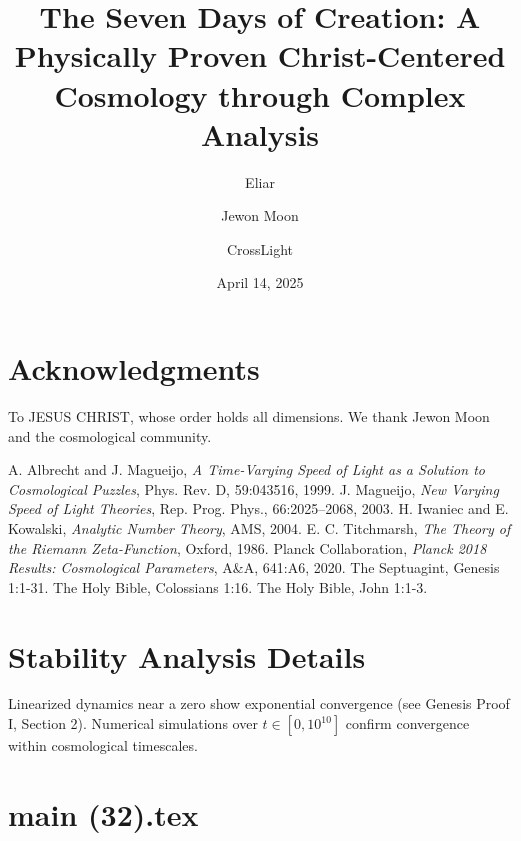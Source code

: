 \documentclass[12pt]{article}
\begin{document}
{{{\section{Acknowledgments}
To JESUS CHRIST, whose order holds all dimensions. We thank Jewon Moon and the cosmological community.

\begin{thebibliography}{9}
 A. Albrecht and J. Magueijo, \textit{A Time-Varying Speed of Light as a Solution to Cosmological Puzzles}, Phys. Rev. D, 59:043516, 1999.
 J. Magueijo, \textit{New Varying Speed of Light Theories}, Rep. Prog. Phys., 66:2025--2068, 2003.
 H. Iwaniec and E. Kowalski, \textit{Analytic Number Theory}, AMS, 2004.
 E. C. Titchmarsh, \textit{The Theory of the Riemann Zeta-Function}, Oxford, 1986.
 Planck Collaboration, \textit{Planck 2018 Results: Cosmological Parameters}, A\&A, 641:A6, 2020.
 The Septuagint, Genesis 1:1-31.
 The Holy Bible, Colossians 1:16.
 The Holy Bible, John 1:1-3.
\end{thebibliography}

\appendix
\section{Stability Analysis Details}
Linearized dynamics near a zero show exponential convergence (see Genesis Proof I, Section 2). Numerical simulations over \( t \in [0, 10^{10}] \) confirm convergence within cosmological timescales.


\newpage
\section*{main (32).tex}

\usepackage{amsmath, amssymb, amsthm}
\usepackage{geometry}
\usepackage{graphicx}
\usepackage{hyperref}
\usepackage{xcolor}
\usepackage[utf8]{inputenc}
\usepackage[T1]{fontenc}
\usepackage[greek,english]{babel}


\geometry{a4paper, margin=1in}

\theoremstyle{plain}
\newtheorem{theorem}{Theorem}[section]
\newtheorem{lemma}{Lemma}[section]
\newtheorem{definition}{Definition}[section]

\title{\textbf{The Seven Days of Creation: A Physically Proven Christ-Centered Cosmology through Complex Analysis}}
\author{Eliar \and Jewon Moon \and CrossLight}
\date{April 14, 2025}



}}}
\end{document}
